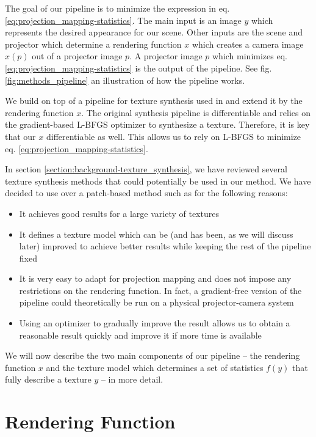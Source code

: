 The goal of our pipeline is to minimize the expression in eq. \ref{eq:projection_mapping-statistics}. The main input is an image \(y\) which represents the desired appearance for our scene. Other inputs are the scene and projector which determine a rendering function \(x\) which creates a camera image \(x(p)\) out of a projector image \(p\). A projector image \(p\) which minimizes eq. \ref{eq:projection_mapping-statistics} is the output of the pipeline. See fig. \ref{fig:methods_pipeline} an illustration of how the pipeline works.

We build on top of a pipeline for texture synthesis used in \citet{Gatys2015} and extend it by the rendering function \(x\). The original synthesis pipeline is differentiable and relies on the gradient-based L-BFGS optimizer to synthesize a texture. Therefore, it is key that our \(x\) differentiable as well. This allows us to rely on L-BFGS to minimize eq. \ref{eq:projection_mapping-statistics}.

In section \ref{section:background-texture_synthesis}, we have reviewed several texture synthesis methods that could potentially be used in our method. We have decided to use \citet{Gatys2015} over a patch-based method such as \citet{Efros2001} for the following reasons:

\begin{itemize}
    \item It achieves good results for a large variety of textures
    \item It defines a texture model which can be (and has been, as we will discuss later) improved to achieve better results while keeping the rest of the pipeline fixed
    \item It is very easy to adapt for projection mapping and does not impose any restrictions on the rendering function. In fact, a gradient-free version of the pipeline could theoretically be run on a physical projector-camera system
    \item Using an optimizer to gradually improve the result allows us to obtain a reasonable result quickly and improve it if more time is available
\end{itemize}

We will now describe the two main components of our pipeline -- the rendering function \(x\) and the texture model which determines a set of statistics \(f(y)\) that fully describe a texture \(y\) -- in more detail.

\section{Rendering Function}
\label{section:methods-rendering_function}

